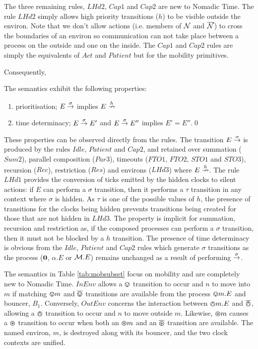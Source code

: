 The three remaining rules, $LHd2$, $Cap1$ and $Cap2$ are new to
Nomadic Time.  The rule $LHd2$ simply allows high priority transitions
($h$) to be visible outside the environ.  Note that we don't allow
actions (i.e. members of $\text{$\mathcal{N}$}$ and $\text{$\overline{\text{$\mathcal{N}$}}$}$) to cross the
boundaries of an environ so communication can not take place between a
process on the outside and one on the inside.  The $Cap1$ and $Cap2$
rules are simply the equivalents of $Act$ and $Patient$ but for the
mobility primitives.  

Consequently,

\begin{proposition}
The semantics exhibit the following properties:
\begin{enumerate}
\item prioritisation;
$E \stackrel{\sigma}{\rightarrow}$ implies $E \stackrel{h}{\nrightarrow}$ 
\item time determinacy; $E \stackrel{\sigma}{\rightarrow} E'$ and $E
\stackrel{\sigma}{\rightarrow} E''$ implies $E' = E''$.\qed
\end{enumerate}
\end{proposition}

These properties can be observed directly from the rules.  The
transition $E \stackrel{\sigma}{\rightarrow}$ is produced by the rules $Idle$,
$Patient$ and $Cap2$, and retained over summation ($Sum2$), parallel
composition ($Par3$), timeouts ($FTO1$, $FTO2$, $STO1$ and $STO3$),
recursion ($Rec$), restriction ($Res$) and environs ($LHd3$) where $E
\stackrel{h}{\nrightarrow}$.  The rule $LHd1$ provides the conversion of ticks
emitted by the hidden clocks to silent actions: if $E$ can perform a
$\sigma$ transition, then it performs a $\tau$ transition in any
context where $\sigma$ is hidden.  As $\tau$ is one of the possible
values of $h$, the presence of transitions for the clocks being hidden
prevents transitions being created for those that are not hidden in
$LHd3$.  The property is implicit for summation, recursion and
restriction as, if the composed processes can perform a $\sigma$
transition, then it must not be blocked by a $h$ transition.  The
presence of time determinacy is obvious from the $Idle$, $Patient$ and
$Cap2$ rules which generate $\sigma$ transitions as the process
($\textbf{0}$, $\alpha.E$ or $\text{$\mathcal{M}$}.E$) remains unchanged as a result of
performing $\stackrel{\sigma}{\rightarrow}$.

The semantics in Table \ref{tab:mobsubset} focus on mobility and are
completely new to Nomadic Time.  $InEnv$ allows a $\varovee$ transition to
occur and $n$ to move into $m$ if matching $\varovee m$ and $\overline{\varovee}$
transitions are available from the process $\varovee m.E$ and bouncer,
$B_1$.  Conversely, $OutEnv$ concerns the interaction between
$\varowedge m.E$ and $\overline{\varowedge}$, allowing a $\varowedge$ transition to occur and
$n$ to move outside $m$.  Likewise, $\varoast m$ causes a $\varoast$
transition to occur when both an $\varoast m$ and an $\overline{\varoast}$
transition are available.  The named environ, $m$, is destroyed along
with its bouncer, and the two clock contexts are unified.

